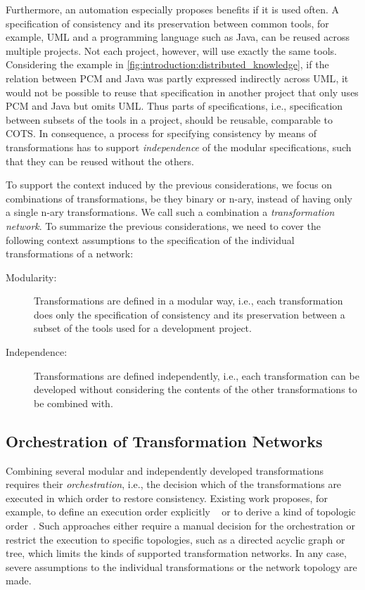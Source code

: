 Furthermore, an automation especially proposes benefits if it is used often.
A specification of consistency and its preservation between common tools, for example, \gls{UML} and a programming language such as Java, can be reused across multiple projects.
Not each project, however, will use exactly the same tools.
Considering the example in \autoref{fig:introduction:distributed_knowledge}, if the relation between \gls{PCM} and Java was partly expressed indirectly across \gls{UML}, it would not be possible to reuse that specification in another project that only uses \gls{PCM} and Java but omits \gls{UML}.
Thus parts of specifications, i.e., specification between subsets of the tools in a project, should be reusable, comparable to \gls{COTS}.
In consequence, a process for specifying consistency by means of transformations has to support \emph{independence} of the modular specifications, such that they can be reused without the others.

To support the context induced by the previous considerations, we focus on combinations of transformations, be they binary or n-ary, instead of having only a single n-ary transformations.
We call such a combination a \emph{transformation network}.
To summarize the previous considerations, we need to cover the following context assumptions to the specification of the individual transformations of a network:
\begin{description}
    \item[Modularity:] Transformations are defined in a modular way, i.e., each transformation does only the specification of consistency and its preservation between a subset of the tools used for a development project.
    \item[Independence:] Transformations are defined independently, i.e., each transformation can be developed without considering the contents of the other transformations to be combined with.
\end{description}


\subsection{Orchestration of Transformation Networks}

Combining several modular and independently developed transformations requires their \emph{orchestration}, i.e., the decision which of the transformations are executed in which order to restore consistency.
Existing work proposes, for example, to define an execution order explicitly ~\cite{pilgrim2008a, vanhooff2007UniTI-MODELS} or to derive a kind of topologic order~\cite{stevens2020BidirectionalTransformationLarge-SoSym}.
Such approaches either require a manual decision for the orchestration or restrict the execution to specific topologies, such as a directed acyclic graph or tree, which limits the kinds of supported transformation networks.
In any case, severe assumptions to the individual transformations or the network topology are made.

